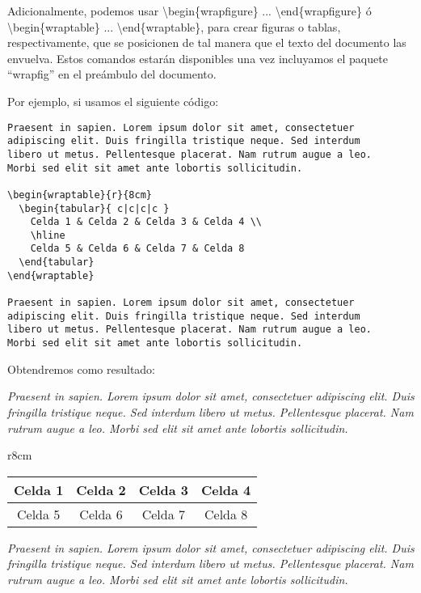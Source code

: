 Adicionalmente, podemos usar \textbackslash begin\{wrapfigure\} ... \textbackslash end\{wrapfigure\} ó \textbackslash begin\{wraptable\} ... \textbackslash end\{wraptable\}, para crear figuras o tablas, respectivamente, que se posicionen de tal manera que el texto del documento las envuelva. Estos comandos estarán disponibles una vez incluyamos el paquete ``wrapfig'' en el preámbulo del documento.

Por ejemplo, si usamos el siguiente código:

\begin{lstlisting}
Praesent in sapien. Lorem ipsum dolor sit amet, consectetuer 
adipiscing elit. Duis fringilla tristique neque. Sed interdum 
libero ut metus. Pellentesque placerat. Nam rutrum augue a leo. 
Morbi sed elit sit amet ante lobortis sollicitudin.

\begin{wraptable}{r}{8cm}
  \begin{tabular}{ c|c|c|c }
    Celda 1 & Celda 2 & Celda 3 & Celda 4 \\
    \hline
    Celda 5 & Celda 6 & Celda 7 & Celda 8
  \end{tabular}
\end{wraptable}

Praesent in sapien. Lorem ipsum dolor sit amet, consectetuer 
adipiscing elit. Duis fringilla tristique neque. Sed interdum 
libero ut metus. Pellentesque placerat. Nam rutrum augue a leo. 
Morbi sed elit sit amet ante lobortis sollicitudin.
\end{lstlisting}


Obtendremos como resultado:

\emph{Praesent in sapien. Lorem ipsum dolor sit amet, consectetuer 
adipiscing elit. Duis fringilla tristique neque. Sed interdum 
libero ut metus. Pellentesque placerat. Nam rutrum augue a leo. 
Morbi sed elit sit amet ante lobortis sollicitudin.}

\begin{wraptable}{r}{8cm}
\begin{tabular}{ c|c|c|c }
 		Celda 1 & Celda 2 & Celda 3 & Celda 4 \\
 		\hline
 		Celda 5 & Celda 6 & Celda 7 & Celda 8
\end{tabular}
\end{wraptable}

\emph{Praesent in sapien. Lorem ipsum dolor sit amet, consectetuer 
adipiscing elit. Duis fringilla tristique neque. Sed interdum 
libero ut metus. Pellentesque placerat. Nam rutrum augue a leo. 
Morbi sed elit sit amet ante lobortis sollicitudin.}

